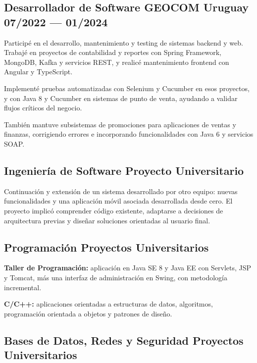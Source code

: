 \documentclass[letter,10pt]{article}
\begin{document}
\subsection{Desarrollador de Software \hfill GEOCOM Uruguay \hfill 07/2022 --- 01/2024}

Participé en el desarrollo, mantenimiento y testing de sistemas backend y web. Trabajé en proyectos de contabilidad y reportes con Spring Framework, MongoDB, Kafka y servicios REST, y realicé mantenimiento frontend con Angular y TypeScript.

Implementé pruebas automatizadas con Selenium y Cucumber en esos proyectos, y con Java 8 y Cucumber en sistemas de punto de venta, ayudando a validar flujos críticos del negocio.

También mantuve subsistemas de promociones para aplicaciones de ventas y finanzas, corrigiendo errores e incorporando funcionalidades con Java 6 y servicios SOAP.

\vspace{5mm}

\subsection{Ingeniería de Software \hfill Proyecto Universitario}

Continuación y extensión de un sistema desarrollado por otro equipo: nuevas funcionalidades y una aplicación móvil asociada desarrollada desde cero. El proyecto implicó comprender código existente, adaptarse a decisiones de arquitectura previas y diseñar soluciones orientadas al usuario final.

\vspace{5mm}

\subsection{Programación \hfill Proyectos Universitarios}

\textbf{Taller de Programación:} aplicación en Java SE 8 y Java EE con Servlets, JSP y Tomcat, más una interfaz de administración en Swing, con metodología incremental.

\textbf{C/C++:} aplicaciones orientadas a estructuras de datos, algoritmos, programación orientada a objetos y patrones de diseño.

\vspace{5mm}

\subsection{Bases de Datos, Redes y Seguridad \hfill Proyectos Universitarios}
\end{document}
